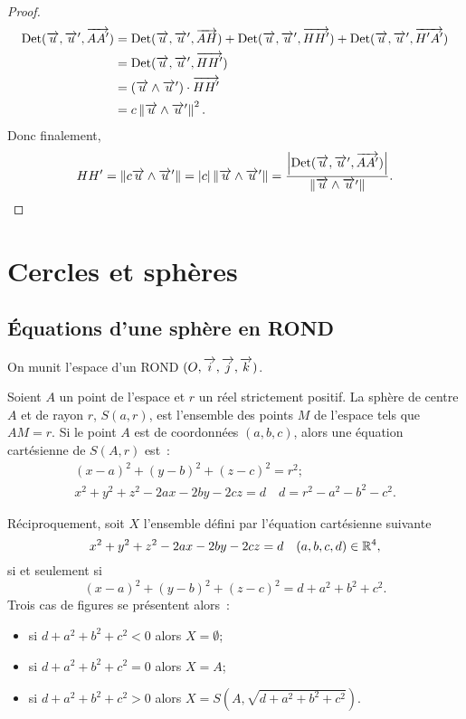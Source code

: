 \begin{proof}
  \begin{align}
    \operatorname{Det}(\overrightarrow{u}, \overrightarrow{u}', \overrightarrow{AA'}) &= \operatorname{Det}(\overrightarrow{u}, \overrightarrow{u}',\overrightarrow{AH}) + \operatorname{Det}(\overrightarrow{u}, 
    \overrightarrow{u}',\overrightarrow{HH'}) + \operatorname{Det}(\overrightarrow{u}, \overrightarrow{u}', \overrightarrow{H'A'})\\
                                &= \operatorname{Det}(\overrightarrow{u}, \overrightarrow{u}',\overrightarrow{HH'})\\
                                &= (\overrightarrow{u}\wedge\overrightarrow{u}')\cdot\overrightarrow{HH'}\\
                                &= c\left\lVert\overrightarrow{u}\wedge\overrightarrow{u}'\right\rVert^2.
  \end{align}
  Donc finalement,
  \begin{equation}
    HH' = \left\lVert c\overrightarrow{u}\wedge\overrightarrow{u}'\right\rVert = \left\lvert c\right\rvert\left\lVert\overrightarrow{u}\wedge\overrightarrow{u}'\right\rVert = 
    \frac{\left\lvert\operatorname{Det}(\overrightarrow{u}, \overrightarrow{u}',\overrightarrow{AA'})\right\rvert}{\left\lVert\overrightarrow{u}\wedge\overrightarrow{u}'\right\rVert}.
  \end{equation}
\end{proof}

\section{Cercles et sphères}

\subsection{Équations d'une sphère en ROND}

On munit l'espace d'un ROND \((O,\overrightarrow{i},\overrightarrow{j},\overrightarrow{k})\).
\begin{defdef}
  Soient \(A\) un point de l'espace et \(r\) un réel strictement positif. La 
  sphère de centre \(A\) et de rayon \(r\), \(S(a, r)\), est l'ensemble des 
  points \(M\) de l'espace tels que \(AM = r\). Si le point \(A\) est de 
  coordonnées \((a, b, c)\), alors une équation cartésienne de \(S(A, r)\) 
  est~:
  \begin{gather}
    (x - a)^2 + (y - b)^2 + (z - c)^2 = r^2; \\
    x^2 + y^2 + z^2 - 2ax - 2by - 2cz = d \quad d = r^2 - a^2 - b^2 - c^2.
  \end{gather}
\end{defdef}

Réciproquement, soit \(X\) l'ensemble défini par l'équation cartésienne 
suivante
\begin{equation}
  x^2 + y^2 + z^2 - 2ax - 2by - 2cz = d \quad (a, b, c, d)\in \mathbb{R}^4,
\end{equation}
si et seulement si
\begin{equation}
  (x - a)^2 + (y - b)^2 + (z - c)^2 = d + a^2 + b^2 + c^2.
\end{equation}
Trois cas de figures se présentent alors~:
\begin{itemize}
  \item si \(d + a^2 + b^2 + c^2<0\) alors \(X = \emptyset\);
  \item si \(d + a^2 + b^2 + c^2 = 0\) alors \(X = A\);
  \item si \(d + a^2 + b^2 + c^2>0\) alors \(X = S(A, \sqrt{d + a^2 + b^2 + 
    c^2})\).
\end{itemize}

